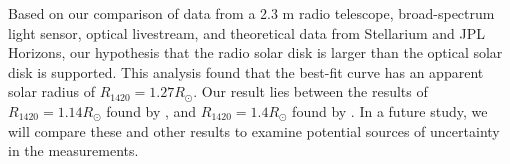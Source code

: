 Based on our comparison of data from a 2.3 m radio telescope, broad-spectrum light sensor, optical livestream, and theoretical data from Stellarium and JPL Horizons, our hypothesis that the radio solar disk is larger than the optical solar disk is supported.
This analysis found that the best-fit curve has an apparent solar radius of $R_{\mathrm{1420}} = 1.27 R_{\odot}$.
Our result lies between the results of $R_{\mathrm{1420}} = 1.14 R_{\odot}$ found by \cite{messerotti_radio_2000}, and $R_{\mathrm{1420}} = 1.4 R_{\odot}$ found by \cite{leung_solar_2022}.
In a future study, we will compare these and other results to examine potential sources of uncertainty in the measurements.